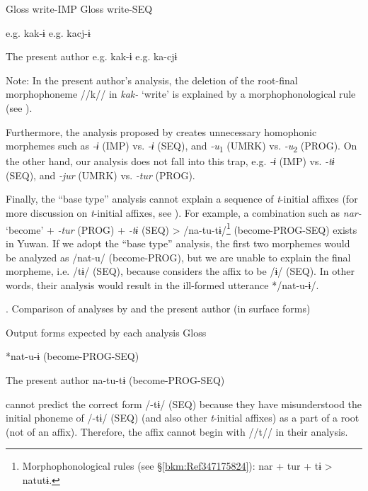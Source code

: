   Gloss  write-IMP    Gloss  write-SEQ

\citet{UchimaEtAl1976}  e.g.  kak-ɨ    e.g.  kacj-ɨ

The present author  e.g.  kak-ɨ    e.g.  ka-cjɨ

Note: In the present author’s analysis, the deletion of the root-final morphophoneme //k// in \textit{kak-} ‘write’ is explained by a morphophonological rule (see ).

  Furthermore, the analysis proposed by \citet{UchimaEtAl1976} creates unnecessary homophonic morphemes such as \textit{{}-ɨ} (IMP) vs. \textit{{}-ɨ} (SEQ), and \textit{{}-u}\textsubscript{1} (UMRK) vs. \textit{{}-u}\textsubscript{2} (PROG). On the other hand, our analysis does not fall into this trap, e.g. \textit{{}-ɨ} (IMP) vs. \textit{{}-tɨ} (SEQ), and \textit{{}-jur} (UMRK) vs. \textit{{}-tur} (PROG).

  Finally, the “base type” analysis cannot explain a sequence of \textit{t}{}-initial affixes (for more discussion on \textit{t}{}-initial affixes, see ). For example, a combination such as \textit{nar-} ‘become’ + \textit{-tur} (PROG) + \textit{{}-tɨ} (SEQ) > /na-tu-tɨ/\footnote{Morphophonological rules (see §\ref{bkm:Ref347175824}): nar + tur + tɨ > natutɨ.} (become-PROG-SEQ) exists in Yuwan. If we adopt the “base type” analysis, the first two morphemes would be analyzed as /nat-u/ (become-PROG), but we are unable to explain the final morpheme, i.e. /tɨ/ (SEQ), because \citet[91-92]{UchimaEtAl1976} considers the affix to be /ɨ/ (SEQ). In other words, their analysis would result in the ill-formed utterance */nat-u-ɨ/.

\begin{styleBeschriftung}
\textmd{. Comparison of analyses by \citet{UchimaEtAl1976} and the present author (in surface forms)}
\end{styleBeschriftung}

  Output forms expected by each analysis  Gloss

\citet{UchimaEtAl1976}  *nat-u-ɨ  (become-PROG-SEQ)

The present author  na-tu-tɨ  (become-PROG-SEQ)

\citet{UchimaEtAl1976} cannot predict the correct form /-tɨ/ (SEQ) because they have misunderstood the initial phoneme of /-tɨ/ (SEQ) (and also other \textit{t}{}-initial affixes) as a part of a root (not of an affix). Therefore, the affix cannot begin with //t// in their analysis.

